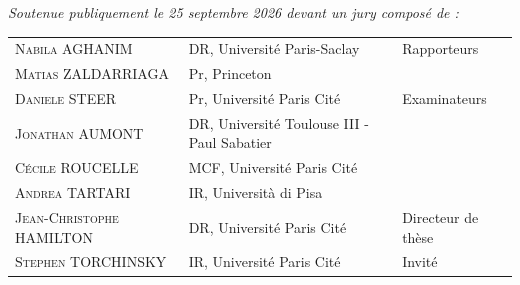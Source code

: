    \vspace{0.1cm}


    \begin{center}
        \textit{Soutenue publiquement le 25 septembre 2026 devant un jury composé de :}
        \vspace{1cm}
        \\
        \small
        \renewcommand{\arraystretch}{1.3}
        \begin{tabularx}{\textwidth}{@{}l >{\raggedright\arraybackslash}X l@{}}
            \textsc{Nabila AGHANIM} & DR, Université Paris-Saclay & Rapporteurs \\
            \textsc{Matias ZALDARRIAGA} & Pr, Princeton \\ %
            \textsc{Daniele STEER} & Pr, Université Paris Cité & Examinateurs \\
            \textsc{Jonathan AUMONT} & DR, Université Toulouse III - Paul Sabatier \\ %
            \textsc{Cécile ROUCELLE} & MCF, Université Paris Cité \\ %
            \textsc{Andrea TARTARI} & IR, Università di Pisa \\ %
            \textsc{Jean-Christophe HAMILTON} & DR, Université Paris Cité & Directeur de thèse \\
            \textsc{Stephen TORCHINSKY} & IR, Université Paris Cité & Invité \\
        \end{tabularx}\\[1cm]
    \end{center}

\newpage
